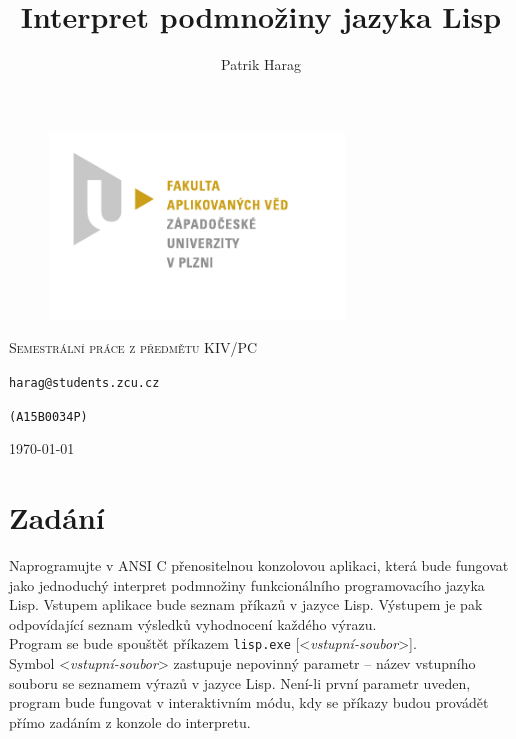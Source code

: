 \documentclass[12pt, a4paper]{report}
\title{Interpret podmnožiny jazyka Lisp}
\author{Patrik Harag}
\makeatletter
\newcommand{\lt}{\textless}
\newcommand{\gt}{\textgreater}
\def \thesubtitle {Semestrální práce z předmětu KIV/PC}
\def \theauthoremail {harag@students.zcu.cz}
\def \theauthorid {(A15B0034P)}
\makeatother
\begin{document}
\begin{titlepage}
	\begin{figure}
		\includegraphics[height=50mm]{img-fav-logo}
	\end{figure}
	
	\centering
	{\large \hspace{1mm} \par} %
	\vspace{15ex}
	
	{\scshape\Large \thesubtitle \par}
	\vspace{1.5ex}
	{\huge\bfseries \thetitle \par}
	\vspace{2ex}
	{\Large\itshape \theauthor \par}
	\vspace{2ex}
	{\texttt{\theauthoremail} \par}
	\vspace{1ex}
	{\texttt{\theauthorid} \par}
	
	\vfill
	
	{\large \today \par}
\end{titlepage}

\setcounter{page}{0} 
\tableofcontents
\thispagestyle{empty}


\chapter{Zadání}
Naprogramujte v ANSI C přenositelnou konzolovou aplikaci, která bude fungovat jako jednoduchý interpret podmnožiny funkcionálního programovacího jazyka Lisp. Vstupem aplikace bude seznam příkazů v jazyce Lisp. Výstupem je pak odpovídající seznam výsledků vyhodnocení každého výrazu.\\

\noindent
Program se bude spouštět příkazem \verb|lisp.exe| [\lt\textit{vstupní-soubor}\gt].\\Symbol \lt\textit{vstupní-soubor}\gt \vspace{1pt} zastupuje nepovinný parametr – název vstupního souboru se seznamem výrazů v jazyce Lisp.
Není-li první parametr uveden, program bude fungovat v interaktivním módu, kdy se příkazy budou provádět přímo zadáním z konzole do interpretu.\\
\end{document}
